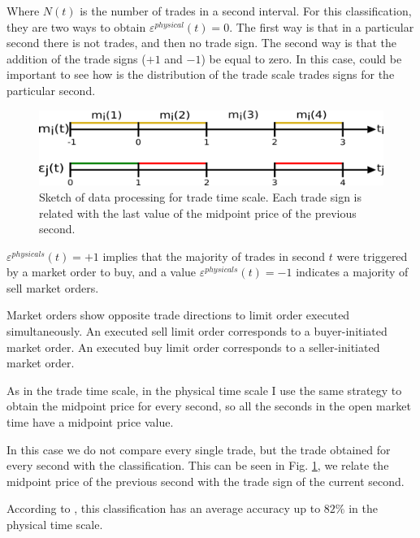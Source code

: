 Where $N \left(t \right)$ is the number of trades in a second interval. For
this classification, they are two ways to obtain
$\varepsilon^{physical}\left( t \right) = 0$. The first way is that in a
particular second there is not trades, and then no trade sign. The second  way
is that the addition of the trade signs ($+1$ and $-1$) be equal to zero. In
this case, could be important to see how is the distribution of the trade scale
trades signs for the particular second.

\begin{figure}[htbp]
    \centering
    \includegraphics[width=\columnwidth]{figures/02_relation_trades_quotes_time_scale.png}
    \caption{Sketch of data processing for trade time scale. Each trade sign is
             related with the last value of the midpoint price of the previous
             second.}
    \label{fig:relation_trades_midpoint_time_scale}
\end{figure}

$\varepsilon^{physicals}\left( t \right) = +1$ implies that the majority of
trades in second $t$ were triggered by a market order to buy, and a value
$\varepsilon^{physicals}\left( t \right) = -1$ indicates a majority of sell
market orders.

Market orders show opposite trade directions to limit order executed
simultaneously. An executed sell limit order corresponds to a buyer-initiated
market order. An executed buy limit order corresponds to a seller-initiated
market order.

As in the trade time scale, in the physical time scale I use the same strategy
to obtain the midpoint price for every second, so all the seconds in the open
market time have a midpoint price value.

In this case we do not compare every single trade, but the trade obtained for
every second with the classification. This can be seen in
Fig. \ref{fig:relation_trades_midpoint_time_scale}, we relate the midpoint
price of the previous second with the trade sign of the current second.

According to \cite{Wang_2016_cross}, this classification has an average
accuracy up to $82\%$ in the physical time scale.